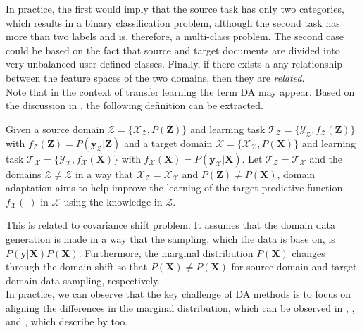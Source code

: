 In practice, the first would imply that the source task has only two categories, which results in a binary classification problem, although the second task has more than two labels and is, therefore, a multi-class problem.
The second case could be based on the fact that source and target documents are divided into very unbalanced user-defined classes.
Finally, if there exists a any relationship between the feature spaces of the two domains, then they are \textit{related}.\cite{Pan.2010}\\
Note that in the context of transfer learning the term \ac{DA} may appear.
Based on the discussion in \cite{Pan.2011}, the following definition can be extracted.
\begin{mDef}\label{DefDa}
	Given a source domain $\mathcal{Z}=\{\mathcal{X}_\mathcal{Z},P(\mathbf{Z})\}$ and learning task $\mathcal{T_Z}=\{\mathcal{Y_Z},f_\mathcal{Z}(\mathbf{Z})\}$ with $f_\mathcal{Z}(\mathbf{Z}) = P(\mathbf{y}_\mathcal{Z}|\mathbf{Z})$ and a target domain $\mathcal{X}=\{\mathcal{X}_\mathcal{X},P(\mathbf{X})\}$ and learning task $\mathcal{T_X}=\{\mathcal{Y_X},f_\mathcal{X}(\mathbf{X})\}$ with $f_\mathcal{X}(\mathbf{X}) = P(\mathbf{y}_\mathcal{X}|\mathbf{X})$. Let $\mathcal{T_Z} = \mathcal{T_X}$ and the domains $\mathcal{Z} \neq \mathcal{Z}$ in a way that $\mathcal{X}_\mathcal{Z} = \mathcal{X}_\mathcal{X}$ and $P(\mathbf{Z}) \neq P(\mathbf{X})$, domain adaptation aims to help improve the learning of the target predictive function $f_\mathcal{X}(\cdot)$ in $\mathcal{X}$ using the knowledge in $\mathcal{Z}$.
\end{mDef}
This is related to covariance shift problem.\cite{Pan.2011}
It assumes that the domain data generation is made in a way that the sampling, which the data is base on, is $P(\mathbf{y}\vert \mathbf{X})P(\mathbf{X})$.
Furthermore,  the marginal distribution $P(\mathbf{X})$ changes through the domain shift so that $P(\mathbf{X}) \neq P(\mathbf{X})$ for source domain and target domain data sampling, respectively.\cite[p. 8-9]{QuinoneroCandela.2009}\\
In practice, we can observe that the key challenge of \acl{DA} methods is to focus on aligning the differences in the marginal distribution, which can be observed in \cite{Pan.2011}, \cite{Long.}, \cite{Fernando.} and \cite{Arnold.2007}, which describe by \cite{Pan.2011} too.

